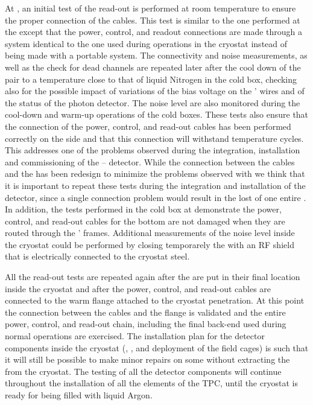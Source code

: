 At \surf, an initial test of the read-out is performed at room temperature to
ensure the proper connection of the cables. This test is similar to the one
performed at the  except that the power, control, and readout
connections are made through a system identical to the one used during
operations in the cryostat instead of being made with a portable system.
The connectivity and noise measurements, as well as the check for dead
channels are repeated later after the cool down of the  pair
to a temperature close to that of liquid Nitrogen in the cold box, 
checking also for the possible impact of variations of the bias voltage
on the ' wires and of the status of the photon detector.
The noise level are also monitored during the cool-down and warm-up 
operations of the cold boxes. These tests also ensure that the connection
of the power, control, and read-out cables has been performed correctly
on the  side and that this connection will withstand temperature 
cycles. This addresses one of the problems observed during the integration,
installation and commissioning of the -- 
detector. While the connection between the cables and the 
has been redesign to minimize the problems observed with 
we think that it is important to repeat these tests during the integration
and installation of the detector, since a single connection problem would
result in the lost of one entire . In addition, the tests 
performed in the cold box at \surf demonstrate the power, control, and read-out
cables for the bottom  are not damaged when they are routed 
through the ' frames. Additional measurements of the noise
level inside the cryostat could be performed by closing temporarely the
 with an RF shield that is electrically connected to the
cryostat steel.

All the read-out tests are repeated again after the  are put
in their final location inside the cryostat and after the power, control, and
read-out cables are connected to the warm flange attached to the cryostat
penetration. At this point the connection between the cables and the flange
is validated and the entire power, control, and read-out chain, including the
final  back-end used during normal operations are exercised. The
installation plan for the detector components inside the cryostat (,
, and deployment of the field cages) is such that it will still
be possible to make minor repairs on some  without extracting
the  from the cryostat. The testing of all the detector components
will continue throughout the installation of all the elements of the TPC, 
until the cryostat is ready for being filled with liquid Argon.

